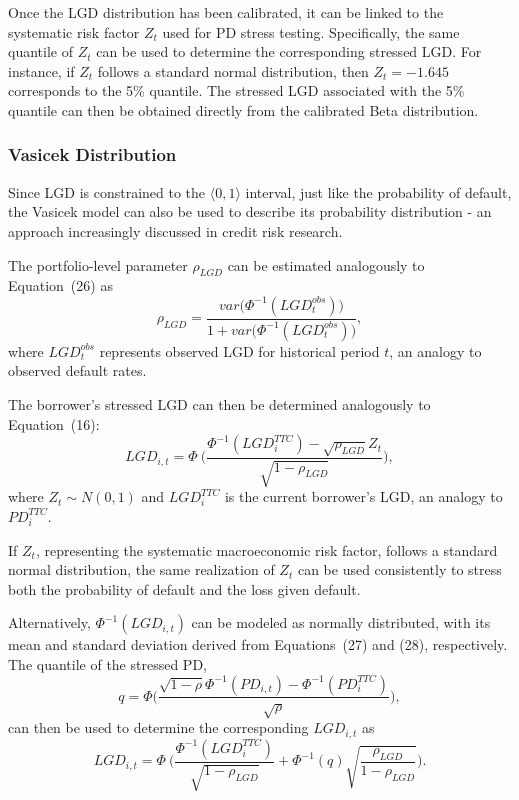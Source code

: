 \documentclass[11pt,a4paper]{article}
\begin{document}
Once the LGD distribution has been calibrated, it can be linked to the systematic risk factor $Z_t$ used for PD stress testing. Specifically, the same quantile of $Z_t$ can be used to determine the corresponding stressed LGD. For instance, if $Z_t$ follows a standard normal distribution, then $Z_t = -1.645$ corresponds to the 5\% quantile. The stressed LGD associated with the 5\% quantile can then be obtained directly from the calibrated Beta distribution.

\subsubsection{Vasicek Distribution}

Since LGD is constrained to the $\langle 0, 1 \rangle$ interval, just like the probability of default, the Vasicek model can also be used to describe its probability distribution - an approach increasingly discussed in credit risk research.

The portfolio-level parameter $\rho_{LGD}$ can be estimated analogously to Equation~(26) as
\begin{equation}
\rho_{LGD} = \frac{var\big( \Phi^{-1}(LGD_t^{obs}) \big)}{1 + var\big( \Phi^{-1}(LGD_t^{obs}) \big)}, 
\end{equation}
where $LGD_t^{obs}$ represents observed LGD for historical period $t$, an analogy to observed default rates.

The borrower's stressed LGD can then be determined analogously to Equation~(16):
\begin{equation}
LGD_{i,t} = \Phi\ \Bigg(\frac{ \Phi^{-1}(LGD_i^{TTC}) - \sqrt{\rho_{LGD}} Z_t}{\sqrt{1 - \rho_{LGD}}} \Bigg),
\end{equation}
where $Z_t \sim N(0,1)$ and $LGD_i^{TTC}$ is the current borrower's LGD, an analogy to $PD_i^{TTC}$.

If $Z_t$, representing the systematic macroeconomic risk factor, follows a standard normal distribution, the same realization of $Z_t$ can be used consistently to stress both the probability of default and the loss given default.

Alternatively, $\Phi^{-1}(LGD_{i,t})$ can be modeled as normally distributed, with its mean and standard deviation derived from Equations~(27) and (28), respectively. The quantile of the stressed PD,
\begin{equation}
q = \Phi \Bigg(\frac{\sqrt{1 - \rho} \Phi^{-1}(PD_{i,t}) - \Phi^{-1}(PD_i^{TTC})}{\sqrt{\rho}} \Bigg),
\end{equation}
can then be used to determine the corresponding $LGD_{i,t}$ as
\begin{equation}
LGD_{i,t} = \Phi\ \Bigg(\frac{\Phi^{-1}(LGD_i^{TTC})}{\sqrt{1 - \rho_{LGD}}} + \Phi^{-1}(q) \sqrt{\frac{\rho_{LGD}}{1 - \rho_{LGD}}} \Bigg).
\end{equation}
\end{document}

